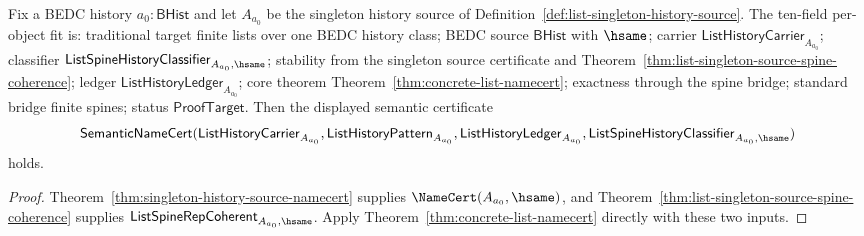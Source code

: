 \begin{theorem}
\label{thm:list-singleton-source-public-object-certificate}
Fix a BEDC history $a_0:\mathsf{BHist}$ and let $A_{a_0}$ be the singleton
history source of Definition~\ref{def:list-singleton-history-source}. The
ten-field per-object fit is: traditional target finite lists over one BEDC
history class; BEDC source $\mathsf{BHist}$ with $\hsame$; carrier
$\mathsf{ListHistoryCarrier}_{A_{a_0}}$; classifier
$\mathsf{ListSpineHistoryClassifier}_{A_{a_0},\hsame}$; stability from the
singleton source certificate and
Theorem~\ref{thm:list-singleton-source-spine-coherence}; ledger
$\mathsf{ListHistoryLedger}_{A_{a_0}}$; core theorem
Theorem~\ref{thm:concrete-list-namecert}; exactness through the spine bridge;
standard bridge finite spines; status $\mathsf{ProofTarget}$. Then the displayed
semantic certificate
$$
\mathsf{SemanticNameCert}(\mathsf{ListHistoryCarrier}_{A_{a_0}},
\mathsf{ListHistoryPattern}_{A_{a_0}},
\mathsf{ListHistoryLedger}_{A_{a_0}},
\mathsf{ListSpineHistoryClassifier}_{A_{a_0},\hsame})
$$
holds.
\end{theorem}
\begin{proof}
Theorem~\ref{thm:singleton-history-source-namecert} supplies
$\NameCert(A_{a_0},\hsame)$, and
Theorem~\ref{thm:list-singleton-source-spine-coherence} supplies
$\mathsf{ListSpineRepCoherent}_{A_{a_0},\hsame}$. Apply
Theorem~\ref{thm:concrete-list-namecert} directly with these two inputs.
\end{proof}


